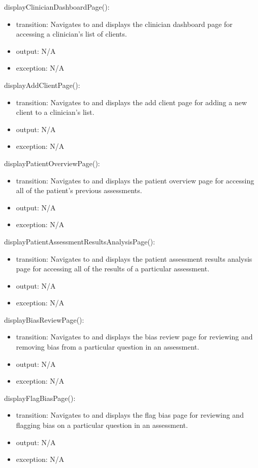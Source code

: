 \documentclass[12pt, titlepage]{article}
\begin{document}
\noindent displayClinicianDashboardPage():
\begin{itemize}
\item transition: Navigates to and displays the clinician dashboard page for accessing a clinician's list of clients.
\item output: N/A
\item exception: N/A
\end{itemize}

\noindent displayAddClientPage():
\begin{itemize}
\item transition: Navigates to and displays the add client page for adding a new client to a clinician's list.
\item output: N/A
\item exception: N/A
\end{itemize}

\noindent displayPatientOverviewPage():
\begin{itemize}
\item transition: Navigates to and displays the patient overview page for accessing all of the patient's previous assessments.
\item output: N/A
\item exception: N/A
\end{itemize}

\noindent displayPatientAssessmentResultsAnalysisPage():
\begin{itemize}
\item transition: Navigates to and displays the patient assessment results analysis page for accessing all of the results of a particular assessment.
\item output: N/A
\item exception: N/A
\end{itemize}

\noindent displayBiasReviewPage():
\begin{itemize}
\item transition: Navigates to and displays the bias review page for reviewing and removing bias from a particular question in an assessment.
\item output: N/A
\item exception: N/A
\end{itemize}

\noindent displayFlagBiasPage():
\begin{itemize}
\item transition: Navigates to and displays the flag bias page for reviewing and flagging bias on a particular question in an assessment.
\item output: N/A
\item exception: N/A
\end{itemize}
\end{document}
